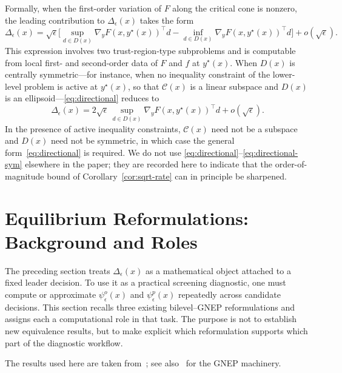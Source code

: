\documentclass[11pt]{article}
\theoremstyle{definition}
\newcommand{\eps}{\epsilon}
\begin{document}
Formally, when the first-order variation of $F$ along the critical
cone is nonzero, the leading contribution to $\Delta_\eps(x)$ takes
the form
\begin{equation}\label{eq:directional}
  \Delta_\eps(x)
  =\sqrt{\eps}\biggl[
    \sup_{d\in D(x)}\nabla_y F(x,y^\star(x))^\top d
    -\inf_{d\in D(x)}\nabla_y F(x,y^\star(x))^\top d
  \biggr]
  +o(\sqrt\eps).
\end{equation}
This expression involves two trust-region-type subproblems and is
computable from local first- and second-order data of $F$ and $f$
at $y^\star(x)$. When $D(x)$ is centrally symmetric---for instance,
when no inequality constraint of the lower-level problem is active
at $y^\star(x)$, so that $\mathcal C(x)$ is a linear subspace and
$D(x)$ is an ellipsoid---\eqref{eq:directional} reduces to
\begin{equation}\label{eq:directional-sym}
  \Delta_\eps(x)=2\sqrt{\eps}\,
  \sup_{d\in D(x)}\nabla_y F(x,y^\star(x))^\top d+o(\sqrt\eps).
\end{equation}
In the presence of active inequality constraints, $\mathcal C(x)$
need not be a subspace and $D(x)$ need not be symmetric, in which
case the general form~\eqref{eq:directional} is required. We do
not use \eqref{eq:directional}--\eqref{eq:directional-sym}
elsewhere in the paper; they are recorded here to indicate that
the order-of-magnitude bound of Corollary~\ref{cor:sqrt-rate} can
in principle be sharpened.

\section{Equilibrium Reformulations: Background and Roles}
\label{sec:reform}
The preceding section treats $\Delta_\eps(x)$ as a mathematical
object attached to a fixed leader decision. To use it as a
practical screening diagnostic, one must compute or approximate
$\psi_\eps^o(x)$ and $\psi_\eps^p(x)$ repeatedly across
candidate decisions. This section recalls three existing
bilevel--GNEP reformulations and assigns each a computational
role in that task. The purpose is not to establish new
equivalence results, but to make explicit which reformulation
supports which part of the diagnostic workflow.

The results used here are taken from~\cite{lampariello2017bridge,
lampariello2020numerically,lampariello2019standard};
see also~\cite{facchinei2010generalized,harker1991generalized,pang2005quasi,kulkarni2012variational,
dreves2011solution} for the GNEP machinery.
\end{document}
